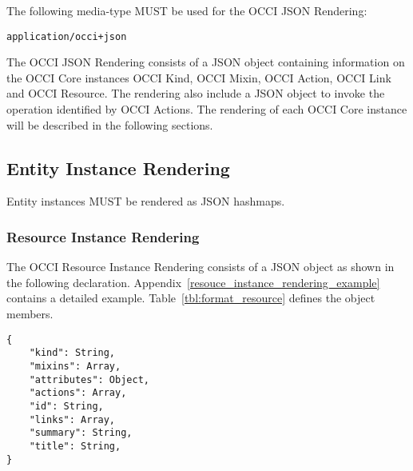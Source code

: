 \documentclass[10pt,a4paper]{article}
\begin{document}
The following media-type MUST be used for the OCCI JSON Rendering:

{\tt application/occi+json}

The OCCI JSON Rendering consists of a JSON object containing information on the
OCCI Core instances OCCI Kind, OCCI Mixin, OCCI Action,
OCCI Link and OCCI Resource. The rendering also include a JSON object to invoke
the operation identified by OCCI Actions.
The rendering of each OCCI Core instance will be
described in the following sections.

\subsection{Entity Instance Rendering}
\label{sec:format_entity_instance_rendering}

Entity instances MUST be rendered as JSON hashmaps.

\subsubsection{Resource Instance Rendering}
\label{sec:format_resource}

The OCCI Resource Instance Rendering consists of a JSON object as shown in the
following declaration. Appendix~\ref{resouce_instance_rendering_example} contains a detailed
example.
Table~\ref{tbl:format_resource} defines the object members.
\begin{lstlisting}
{
    "kind": String,
    "mixins": Array,
    "attributes": Object,
    "actions": Array,
    "id": String,
    "links": Array,
    "summary": String,
    "title": String,
}
\end{lstlisting}
\end{document}
